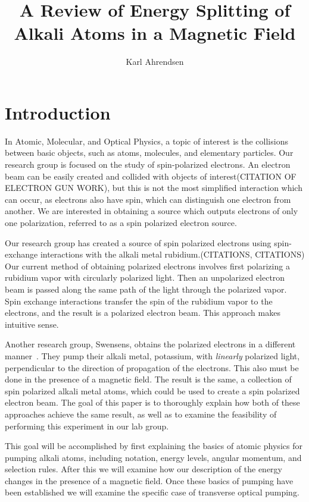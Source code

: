 \documentclass[letter,12pt]{article}
\begin{document}
\title{A Review of Energy Splitting of Alkali Atoms in a Magnetic Field}
\author{Karl Ahrendsen}
\maketitle{}

\section{Introduction}
In Atomic, Molecular,
and Optical Physics, a topic of interest is the collisions between
basic 
objects, such as atoms, molecules, and elementary particles.
Our research group is focused on the study of spin-polarized electrons. 
An electron beam can be easily created and collided
with objects of interest(CITATION OF ELECTRON GUN WORK),
but this is not the most simplified interaction
which can occur, as electrons also have spin, which can distinguish one 
electron from another. We are interested in obtaining a source which
outputs electrons of only one polarization, referred to as a spin
polarized electron source.

Our research group has created a source of spin polarized
electrons using spin-exchange interactions with the alkali metal
rubidium.(CITATIONS, CITATIONS)  Our current method of obtaining 
polarized electrons involves first polarizing a rubidium vapor
with circularly polarized light. Then an unpolarized electron beam
is passed along the same path of the light 
through the polarized vapor. Spin exchange interactions
transfer the spin of the rubidium vapor to the electrons, and the 
result is a polarized electron beam. This approach makes intuitive
sense.

Another research group, Swensens, obtains the polarized electrons
in a different manner~\cite{swenson}. They pump their alkali metal, 
potassium, with
\emph{linearly} polarized light, perpendicular to the direction
of propagation of the electrons. This also must be done in the
presence of a magnetic field. The result is the same, a collection
of spin polarized alkali metal atoms, which could be used to create
a spin polarized electron beam. The goal of this paper is to thoroughly
explain how both of these approaches achieve the same result, as well 
as to examine the feasibility of performing this experiment in our
lab group.

This goal will  be accomplished by first explaining the basics 
of atomic physics for pumping alkali atoms, including notation, energy
levels, angular momentum, and selection rules. After this we
will examine how our description of the energy changes in the
presence of a magnetic
field. Once these basics of pumping have been established we will
examine the specific case of transverse optical pumping. 
\end{document}
